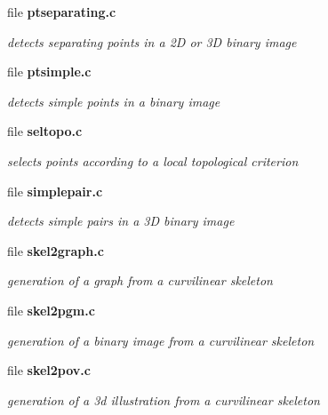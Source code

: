 \begin{CompactItemize}
\item 
file {\bf ptseparating.c}
\begin{CompactList}\small\item\em detects separating points in a 2D or 3D binary image \item\end{CompactList}

\item 
file {\bf ptsimple.c}
\begin{CompactList}\small\item\em detects simple points in a binary image \item\end{CompactList}

\item 
file {\bf seltopo.c}
\begin{CompactList}\small\item\em selects points according to a local topological criterion \item\end{CompactList}

\item 
file {\bf simplepair.c}
\begin{CompactList}\small\item\em detects simple pairs in a 3D binary image \item\end{CompactList}

\item 
file {\bf skel2graph.c}
\begin{CompactList}\small\item\em generation of a graph from a curvilinear skeleton \item\end{CompactList}

\item 
file {\bf skel2pgm.c}
\begin{CompactList}\small\item\em generation of a binary image from a curvilinear skeleton \item\end{CompactList}

\item 
file {\bf skel2pov.c}
\begin{CompactList}\small\item\em generation of a 3d illustration from a curvilinear skeleton \item\end{CompactList}


\end{CompactItemize}
